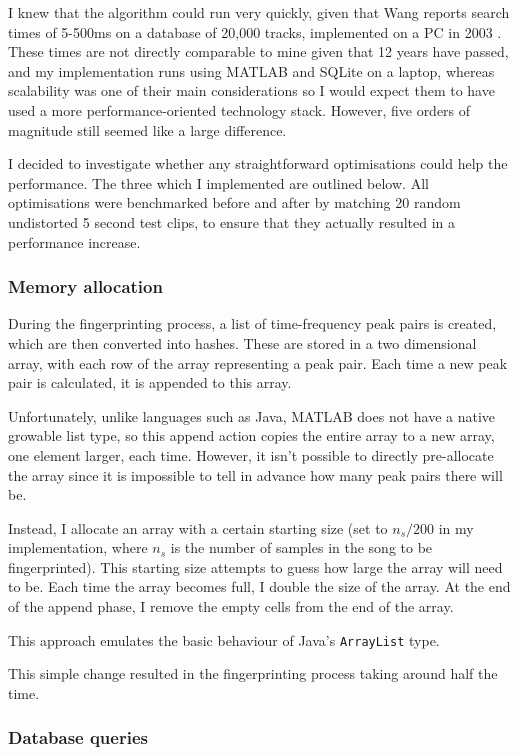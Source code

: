 \documentclass[12pt,a4paper,twoside,openright]{report}
\begin{document}
I knew that the algorithm could run very quickly, given that Wang reports search times of 5-500ms on a database of 20,000 tracks, implemented on a PC in 2003 \cite{Wang03}. These times are not directly comparable to mine given that 12 years have passed, and my implementation runs using MATLAB and SQLite on a laptop, whereas scalability was one of their main considerations so I would expect them to have used a more performance-oriented technology stack. However, five orders of magnitude still seemed like a large difference. 

I decided to investigate whether any straightforward optimisations could help the performance. The three which I implemented are outlined below. All optimisations were benchmarked before and after by matching 20 random undistorted 5 second test clips, to ensure that they actually resulted in a performance increase.

\subsubsection{Memory allocation}

During the fingerprinting process, a list of time-frequency peak pairs is created, which are then converted into hashes. These are stored in a two dimensional array, with each row of the array representing a peak pair. Each time a new peak pair is calculated, it is appended to this array.

Unfortunately, unlike languages such as Java, MATLAB does not have a native growable list type, so this append action copies the entire array to a new array, one element larger, each time. However, it isn't possible to directly pre-allocate the array since it is impossible to tell in advance how many peak pairs there will be.

Instead, I allocate an array with a certain starting size (set to $n_s/200$ in my implementation, where $n_s$ is the number of samples in the song to be fingerprinted). This starting size attempts to guess how large the array will need to be. Each time the array becomes full, I double the size of the array. At the end of the append phase, I remove the empty cells from the end of the array.

This approach emulates the basic behaviour of Java's \lstinline{ArrayList} type.

This simple change resulted in the fingerprinting process taking around half the time.

\subsubsection{Database queries}
\end{document}
